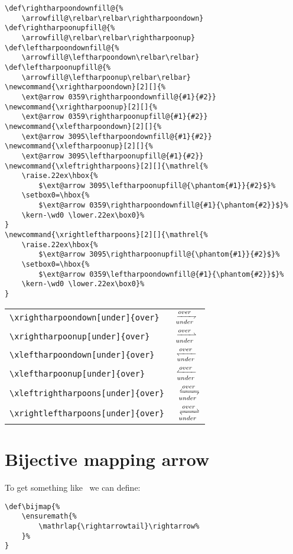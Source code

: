 \begin{table}[htb]
\begin{lstlisting}
\def\rightharpoondownfill@{%
	\arrowfill@\relbar\relbar\rightharpoondown}
\def\rightharpoonupfill@{%
	\arrowfill@\relbar\relbar\rightharpoonup}
\def\leftharpoondownfill@{%
	\arrowfill@\leftharpoondown\relbar\relbar}
\def\leftharpoonupfill@{%
	\arrowfill@\leftharpoonup\relbar\relbar}
\newcommand{\xrightharpoondown}[2][]{%
	\ext@arrow 0359\rightharpoondownfill@{#1}{#2}}
\newcommand{\xrightharpoonup}[2][]{%
	\ext@arrow 0359\rightharpoonupfill@{#1}{#2}}
\newcommand{\xleftharpoondown}[2][]{%
	\ext@arrow 3095\leftharpoondownfill@{#1}{#2}}
\newcommand{\xleftharpoonup}[2][]{%
	\ext@arrow 3095\leftharpoonupfill@{#1}{#2}}
\newcommand{\xleftrightharpoons}[2][]{\mathrel{%
	\raise.22ex\hbox{%
		$\ext@arrow 3095\leftharpoonupfill@{\phantom{#1}}{#2}$}%
	\setbox0=\hbox{%
		$\ext@arrow 0359\rightharpoondownfill@{#1}{\phantom{#2}}$}%
	\kern-\wd0 \lower.22ex\box0}%
}
\newcommand{\xrightleftharpoons}[2][]{\mathrel{%
	\raise.22ex\hbox{%
		$\ext@arrow 3095\rightharpoonupfill@{\phantom{#1}}{#2}$}%
	\setbox0=\hbox{%
		$\ext@arrow 0359\leftharpoondownfill@{#1}{\phantom{#2}}$}%
	\kern-\wd0 \lower.22ex\box0}%
}
\end{lstlisting}

\begin{tabular}{ll}
\verb|\xrightharpoondown[under]{over}| & $\xrightharpoondown[under]{over}$\\[10pt]
\verb|\xrightharpoonup[under]{over}|   & $\xrightharpoonup[under]{over}$ \\[10pt]
\verb|\xleftharpoondown[under]{over}|  & $\xleftharpoondown[under]{over}$\\[10pt]
\verb|\xleftharpoonup[under]{over}|    & $\xleftharpoonup[under]{over}$  \\[10pt]
\verb|\xleftrightharpoons[under]{over}|& $\xleftrightharpoons[under]{over}$\\[10pt]
\verb|\xrightleftharpoons[under]{over}|& $\xrightleftharpoons[under]{over}$
\end{tabular}


\section{Bijective mapping arrow}

To get something like \bijmap~we can define:
\begin{lstlisting}
\def\bijmap{%
	\ensuremath{%
		\mathrlap{\rightarrowtail}\rightarrow%
	}%
}
\end{lstlisting}


\end{table}
